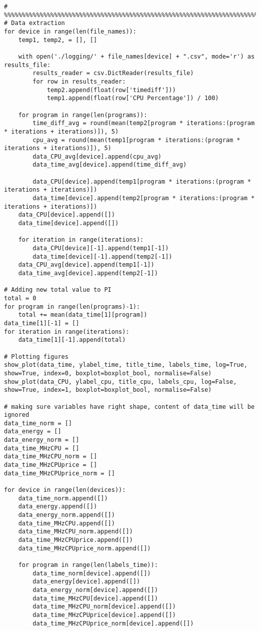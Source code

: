 \begin{lstlisting}
# %%%%%%%%%%%%%%%%%%%%%%%%%%%%%%%%%%%%%%%%%%%%%%%%%%%%%%%%%%%%%%%%%%%%%%%%%%%%%%%%%%%%%%%
# Data extraction
for device in range(len(file_names)):
	temp1, temp2, = [], []
	
	with open('./logging/' + file_names[device] + ".csv", mode='r') as results_file:
		results_reader = csv.DictReader(results_file)
		for row in results_reader:
			temp2.append(float(row['timediff']))
			temp1.append(float(row['CPU Percentage']) / 100)
	
	for program in range(len(programs)):
		time_diff_avg = round(mean(temp2[program * iterations:(program * iterations + iterations)]), 5)
		cpu_avg = round(mean(temp1[program * iterations:(program * iterations + iterations)]), 5)
		data_CPU_avg[device].append(cpu_avg)
		data_time_avg[device].append(time_diff_avg)
	
		data_CPU[device].append(temp1[program * iterations:(program * iterations + iterations)])
		data_time[device].append(temp2[program * iterations:(program * iterations + iterations)])
	data_CPU[device].append([])
	data_time[device].append([])
	
	for iteration in range(iterations):
		data_CPU[device][-1].append(temp1[-1])
		data_time[device][-1].append(temp2[-1])
	data_CPU_avg[device].append(temp1[-1])
	data_time_avg[device].append(temp2[-1])

# Adding new total value to PI
total = 0
for program in range(len(programs)-1):
	total += mean(data_time[1][program])
data_time[1][-1] = []
for iteration in range(iterations):
	data_time[1][-1].append(total)

# Plotting figures
show_plot(data_time, ylabel_time, title_time, labels_time, log=True, show=True, index=0, boxplot=boxplot_bool, normalise=False)
show_plot(data_CPU, ylabel_cpu, title_cpu, labels_cpu, log=False, show=True, index=1, boxplot=boxplot_bool, normalise=False)

# making sure variables have right shape, content of data_time will be ignored
data_time_norm = []
data_energy = []
data_energy_norm = []
data_time_MHzCPU = []
data_time_MHzCPU_norm = []
data_time_MHzCPUprice = []
data_time_MHzCPUprice_norm = []

for device in range(len(devices)):
	data_time_norm.append([])
	data_energy.append([])
	data_energy_norm.append([])
	data_time_MHzCPU.append([])
	data_time_MHzCPU_norm.append([])
	data_time_MHzCPUprice.append([])
	data_time_MHzCPUprice_norm.append([])
	
	for program in range(len(labels_time)):
		data_time_norm[device].append([])
		data_energy[device].append([])
		data_energy_norm[device].append([])
		data_time_MHzCPU[device].append([])
		data_time_MHzCPU_norm[device].append([])
		data_time_MHzCPUprice[device].append([])
		data_time_MHzCPUprice_norm[device].append([])
		

\end{lstlisting}
